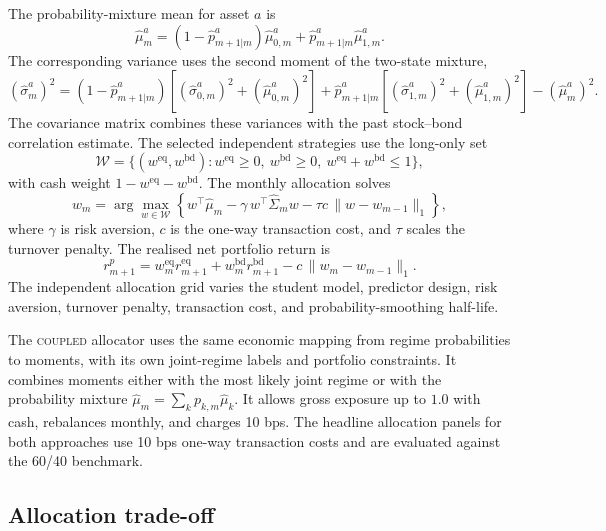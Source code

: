 \documentclass[10pt]{article}
\newcommand{\Acoup}{\textsc{coupled}}
\begin{document}
The probability-mixture mean for asset \(a\) is
\begin{equation}
\hat\mu^a_m
=
(1-\hat p^a_{m+1|m})\hat\mu^a_{0,m}
+
\hat p^a_{m+1|m}\hat\mu^a_{1,m}.
\label{eq:independent-allocation-mean}
\end{equation}
The corresponding variance uses the second moment of the two-state mixture,
\begin{equation}
(\hat\sigma^a_m)^2
=
(1-\hat p^a_{m+1|m})\left[(\hat\sigma^a_{0,m})^2+(\hat\mu^a_{0,m})^2\right]
+
\hat p^a_{m+1|m}\left[(\hat\sigma^a_{1,m})^2+(\hat\mu^a_{1,m})^2\right]
-
(\hat\mu^a_m)^2 .
\label{eq:independent-allocation-variance}
\end{equation}
The covariance matrix combines these variances with the past stock--bond correlation
estimate. The selected independent strategies use the long-only set
\[
\mathcal W=\{(w^{\mathrm{eq}},w^{\mathrm{bd}}):w^{\mathrm{eq}}\ge0,\ w^{\mathrm{bd}}\ge0,\ w^{\mathrm{eq}}+w^{\mathrm{bd}}\le1\},
\]
with cash weight \(1-w^{\mathrm{eq}}-w^{\mathrm{bd}}\). The monthly allocation solves
\begin{equation}
w_m=\arg\max_{w\in\mathcal W}
\left\{
w^{\top}\hat\mu_m
-\gamma\,w^{\top}\hat\Sigma_m w
-\tau c\,\lVert w-w_{m-1}\rVert_1
\right\},
\label{eq:mv}
\end{equation}
where \(\gamma\) is risk aversion, \(c\) is the one-way transaction cost, and \(\tau\) scales
the turnover penalty. The realised net portfolio return is
\[
r^{p}_{m+1}
=
w^{\mathrm{eq}}_m r^{\mathrm{eq}}_{m+1}
+
w^{\mathrm{bd}}_m r^{\mathrm{bd}}_{m+1}
-
c\,\lVert w_m-w_{m-1}\rVert_1 .
\]
The independent allocation grid varies the student model, predictor design, risk aversion,
turnover penalty, transaction cost, and probability-smoothing half-life.

The \Acoup{} allocator uses the same economic mapping from regime probabilities to moments,
with its own joint-regime labels and portfolio constraints. It combines moments either with
the most likely joint regime or with the probability mixture
\(\hat\mu_m=\sum_k p_{k,m}\hat\mu_k\). It allows gross exposure up to \(1.0\) with cash, rebalances
monthly, and charges 10 bps. The headline allocation panels for both approaches use 10 bps
one-way transaction costs and are evaluated against the 60/40 benchmark.

\subsection{Allocation trade-off}
\label{sec:alloc-results}
\label{subsec:results-dynamic-allocation}
\end{document}

